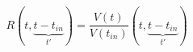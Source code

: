 \begin{equation}
R(t,\underbrace{t-t_{in}}_{t'})=\frac{V(t)}{V(t_{in})} (t,\underbrace{t-t_{in}}_{t'})
\end{equation}
